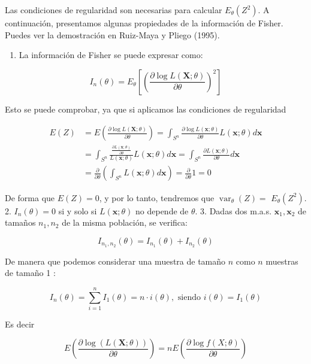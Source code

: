 \documentclass[
]{article}
\providecommand{\tightlist}{%
  \setlength{\itemsep}{0pt}\setlength{\parskip}{0pt}}
\begin{document}
Las condiciones de regularidad son necesarias para calcular \(E_{\theta}\left(Z^{2}\right)\).
A continuación, presentamos algunas propiedades de la información de Fisher. Puedes ver la demostración en Ruiz-Maya y Pliego (1995).

\begin{enumerate}
\def\labelenumi{\arabic{enumi}.}
\tightlist
\item
  La información de Fisher se puede expresar como:
\end{enumerate}

\[
I_{n}(\theta)=E_{\theta}\left[\left(\frac{\partial \log L(\mathbf{X} ; \theta)}{\partial \theta}\right)^{2}\right]
\]

Esto se puede comprobar, ya que si aplicamos las condiciones de regularidad

\[
\begin{aligned}
E(Z) & =E\left(\frac{\partial \log L(\mathbf{X} ; \theta)}{\partial \theta}\right)=\int_{S^{n}} \frac{\partial \log L(\mathbf{x} ; \theta)}{\partial \theta} L(\mathbf{x} ; \theta) d \mathbf{x} \\
& =\int_{S^{n}} \frac{\frac{\partial L(\mathbf{x} ; \theta)}{\partial \theta}}{L(\mathbf{x} ; \theta)} L(\mathbf{x} ; \theta) d \mathbf{x}=\int_{S^{n}} \frac{\partial L(\mathbf{x} ; \theta)}{\partial \theta} d \mathbf{x} \\
& =\frac{\partial}{\partial \theta}\left(\int_{S^{n}} L(\mathbf{x} ; \theta) d \mathbf{x}\right)=\frac{\partial}{\partial \theta} 1=0
\end{aligned}
\]

De forma que \(E(Z)=0\), y por lo tanto, tendremos que \(\operatorname{var}_{\theta}(Z)=\) \(E_{\theta}\left(Z^{2}\right)\).
2. \(I_{n}(\theta)=0\) si y solo si \(L(\mathbf{x} ; \theta)\) no depende de \(\theta\).
3. Dadas dos m.a.s. \(\mathbf{x}_{1}, \mathbf{x}_{2}\) de tamaños \(n_{1}, n_{2}\) de la misma población, se verifica:

\[
I_{n_{1}, n_{2}}(\theta)=I_{n_{1}}(\theta)+I_{n_{2}}(\theta)
\]

De manera que podemos considerar una muestra de tamaño \(n\) como \(n\) muestras de tamaño 1 :

\[
I_{n}(\theta)=\sum_{i=1}^{n} I_{1}(\theta)=n \cdot i(\theta), \text { siendo } i(\theta)=I_{1}(\theta)
\]

Es decir

\[
E\left(\frac{\partial \log (L(\mathbf{X} ; \theta))}{\partial \theta}\right)=n E\left(\frac{\partial \log f(X ; \theta)}{\partial \theta}\right)
\]
\end{document}
